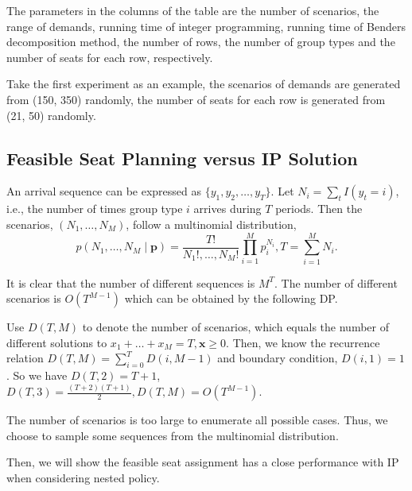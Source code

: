 The parameters in the columns of the table are the number of scenarios, the range of demands, running time of integer programming, running time of Benders decomposition method, the number of rows, the number of group types and the number of seats for each row, respectively. 

Take the first experiment as an example, the scenarios of demands are generated from (150, 350) randomly, the number of seats for each row is generated from (21, 50) randomly.




\subsection{Feasible Seat Planning versus IP Solution}
An arrival sequence can be expressed as $\{y_{1}, y_{2}, \ldots, y_{T}\}$. Let $N_{i} = \sum_{t} I(y_t = i)$, i.e., the number of times group type $i$ arrives during $T$ periods. Then the scenarios, $(N_1, \ldots, N_{M})$, follow a multinomial distribution, $$p\left(N_1, \ldots, N_{M} \mid \mathbf{p}\right)=\frac{T !}{N_{1}!, \ldots, N_{M}!} \prod_{i=1}^{M} p_{i}^{N_i}, T = \sum_{i=1}^{M} N_{i}.$$

It is clear that the number of different sequences is $M^{T}$. The number of different scenarios is $O(T^{M-1})$ which can be obtained by the following DP.

Use $D(T, M) $ to denote the number of scenarios, which equals the number of different solutions to $x_{1}+\ldots + x_{M} = T, \mathbf{x} \geq 0$. Then, we know the recurrence relation $D(T, M) = \sum_{i= 0}^{T} D(i, M-1)$ and boundary condition, $D(i,1) = 1$. So we have $D(T,2) = T+1$, $D(T,3) = \frac{(T+2)(T+1)}{2}, D(T,M) = O(T^{M-1})$. 

The number of scenarios is too large to enumerate all possible cases. Thus, we choose to sample some sequences from the multinomial distribution.

Then, we will show the feasible seat assignment has a close performance with IP when considering nested policy.


